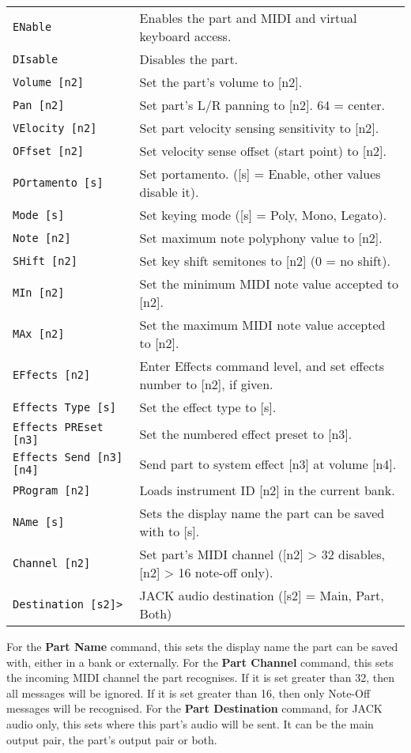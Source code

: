 \begin{table}[H]
\begin{tabular}{l l}
\texttt{ENable} &
   Enables the part and MIDI and virtual keyboard access. \\
\texttt{DIsable} &
   Disables the part. \\
\texttt{Volume [n2]} &
   Set the part's volume to [n2]. \\
\texttt{Pan [n2]} &
   Set part's L/R panning to [n2]. 64 = center. \\
\texttt{VElocity [n2]} &
   Set part velocity sensing sensitivity to [n2]. \\
\texttt{OFfset [n2]} &
   Set velocity sense offset (start point) to [n2]. \\
\texttt{POrtamento [s]} &
   Set portamento. ([s] = Enable, other values disable it). \\
\texttt{Mode [s]} &
   Set keying mode ([s] = Poly, Mono, Legato). \\
\texttt{Note [n2]} &
   Set maximum note polyphony value to [n2]. \\
\texttt{SHift [n2]} &
   Set key shift semitones to [n2] (0 = no shift). \\
\texttt{MIn [n2]} &
   Set the minimum MIDI note value accepted to [n2]. \\
\texttt{MAx [n2]} &
   Set the maximum MIDI note value accepted to [n2]. \\
\texttt{EFfects [n2]} &
   Enter Effects command level, and set effects number to [n2], if given. \\
\texttt{Effects Type [s]} &
   Set the effect type to [s]. \\
\texttt{Effects PREset [n3]} &
   Set the numbered effect preset to [n3]. \\
\texttt{Effects Send [n3] [n4]} &
   Send part to system effect [n3] at volume [n4]. \\
\texttt{PRogram [n2]} &
   Loads instrument ID [n2] in the current bank. \\
\texttt{NAme [s]} &
   Sets the display name the part can be saved with to [s]. \\
\texttt{Channel [n2]} &
   Set part's MIDI channel ([n2] > 32 disables, [n2] > 16 note-off only). \\
\texttt{Destination [s2]>} &
   JACK audio destination ([s2] = Main, Part, Both) \\

      \end{tabular}
   \end{table}

   For the \textbf{Part Name} command, this sets the display name the part can
   be saved with, either in a bank or externally.
   For the \textbf{Part Channel} command, this sets the incoming MIDI channel
   the part recognises. If it is set greater than 32, then all messages will be
   ignored.  If it is set greater than 16, then only Note-Off messages will be
   recognised.
   For the \textbf{Part Destination} command, for JACK audio only,
   this sets where this part's audio will be sent. It can be the main output
   pair, the part's output pair or both.


